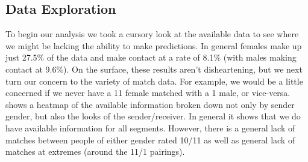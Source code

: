 \clearpage
\begin{appendices}

\section{Data Exploration} \label{app:1}
To begin our analysis we took a cursory look at the available data to see where we might be lacking the ability to make predictions.  In general females make up just 27.5\% of the data and make contact at a rate of 8.1\% (with males making contact at 9.6\%).  On the surface, these results aren't disheartening, but we next turn our concern to the variety of match data.  For example, we would be a little concerned if we never have a 11 female matched with a 1 male, or vice-versa.  shows  a heatmap of the available information broken down not only by sender gender, but also the looks of the sender/receiver.  In general it shows that we do have available information for all segments.  However, there is a general lack of matches between people of either gender rated 10/11 as well as general lack of matches at extremes (around the 11/1 pairings).



\end{appendices}



% 


